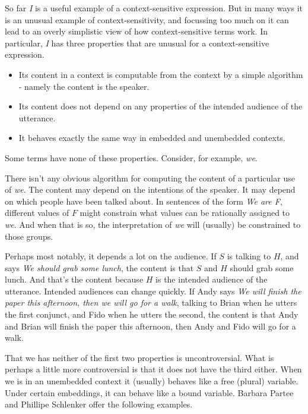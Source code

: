 So far \textit{I} is a useful example of a context-sensitive expression. But in many ways it is an unusual example of context-sensitivity, and focussing too much on it can lead to an overly simplistic view of how context-sensitive terms work. In particular, \textit{I} has three properties that are unusual for a context-sensitive expression.

\begin{itemize}
\item Its content in a context is computable from the context by a simple algorithm - namely the content is the speaker.
\item Its content does not depend on any properties of the intended audience of the utterance.
\item It behaves exactly the same way in embedded and unembedded contexts.
\end{itemize}

\noindent Some terms have none of these properties. Consider, for example, \textit{we}.
 
There isn't any obvious algorithm for computing the content of a particular use of \textit{we}. The content may depend on the intentions of the speaker. It may depend on which people have been talked about. In sentences of the form \textit{We are F}, different values of $F$ might constrain what values can be rationally assigned to \textit{we}. And when that is so, the interpretation of \textit{we} will (usually) be constrained to those groups.

Perhaps most notably, it depends a lot on the audience. If $S$ is talking to $H$, and says \textit{We should grab some lunch}, the content is that $S$ and $H$ should grab some lunch. And that's the content because $H$ is the intended audience of the utterance. Intended audiences can change quickly. If Andy says \textit{We will finish the paper this afternoon, then we will go for a walk}, talking to Brian when he utters the first conjunct, and Fido when he utters the second, the content is that Andy and Brian will finish the paper this afternoon, then Andy and Fido will go for a walk.

That we has neither of the first two properties is uncontroversial. What is perhaps a little more controversial is that it does not have the third either. When we is in an unembedded context it (usually) behaves like a free (plural) variable. Under certain embeddings, it can behave like a bound variable. Barbara Partee and Phillipe Schlenker offer the following examples.


